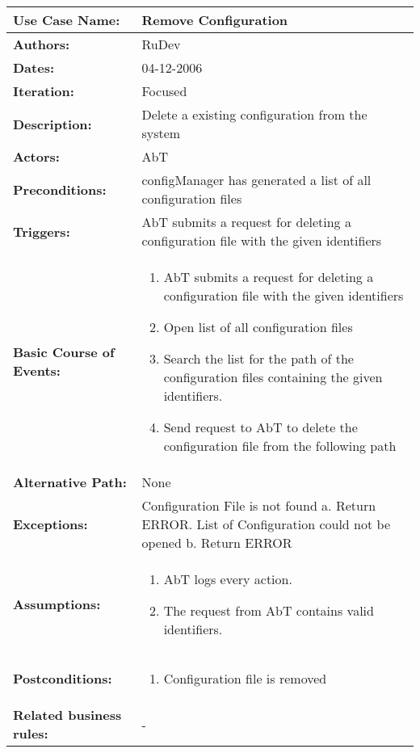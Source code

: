 \begin{tabularx}{\linewidth}{|l|X|}
\hline
\textbf{Use Case Name:} & \textbf{Remove Configuration} \\
\hline
\textbf{Authors:} & RuDev \\
\hline
\textbf{Dates:} & 04-12-2006 \\
\hline
\textbf{Iteration:} & Focused \\
\hline
\textbf{Description:} & Delete a existing configuration from the system\\
\hline
\textbf{Actors:} & AbT \\
\hline
\textbf{Preconditions:} & configManager has generated a list of all configuration files \\
\hline
\textbf{Triggers:} & AbT submits a request for deleting a configuration file with the given identifiers \\
\hline
\textbf{Basic Course of Events:} & 
\begin{minipage}{\linewidth} 
  \vspace{0.05em}
  \begin{enumerate}
   \item AbT submits a request for deleting a configuration file with the given identifiers
   \item Open list of all configuration files
   \item Search the list for the path of the configuration files containing the given identifiers. 
   \item Send request to AbT to delete the configuration file from the following path
  \end{enumerate}
  \vspace{0.05em}
\end{minipage}
\\
\hline 
\textbf{Alternative Path:} & None  \\
\hline
\textbf{Exceptions:} & Configuration File is not found \newline a. Return ERROR. \newline \newline List of Configuration could not be opened \newline b. Return ERROR \\
\hline
\textbf{Assumptions:} & \begin{enumerate} 
							\item AbT logs every action.
							\item The request from AbT contains valid identifiers.
						\end{enumerate} \\
\hline
\textbf{Postconditions:} & 
  \begin{minipage}{\linewidth}
  \vspace{0.05em}
  \begin{enumerate}
    \item Configuration file is removed
  \end{enumerate}
  \vspace{0.05em}
\end{minipage}
\\
\hline
\textbf{Related business rules:} & - \\
\hline
\end{tabularx}


